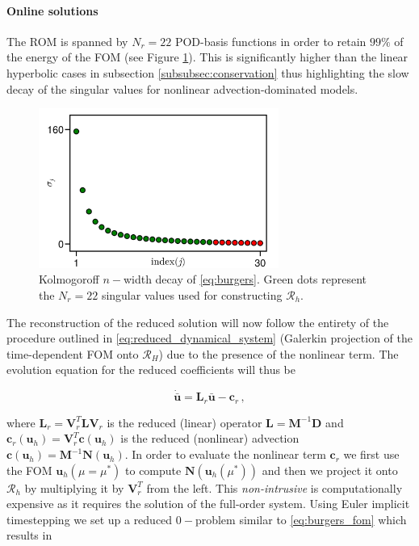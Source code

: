 \documentclass[../main.tex]{subfiles}
\begin{document}
\paragraph{Online solutions}\label{par:burgers_rom}

The ROM is spanned by $N_{r}=22$ POD-basis functions in order to retain $99\%$ of the energy of the FOM (see Figure \ref{fig:burgers_decay}).
This is significantly higher than the linear hyperbolic cases in subsection \ref{subsubsec:conservation} thus highlighting the slow decay of the singular values for nonlinear advection-dominated models.

\begin{figure}[H]
    \centering 
    \includegraphics[keepaspectratio, width=0.7\textwidth]{../figures/fig:burgers_decay.png}
    \caption{Kolmogoroff $n-$width decay of \eqref{eq:burgers}. Green dots represent the $N_{r}=22$ singular values used for constructing $\mathcal{R}_{h}$.}
    \label{fig:burgers_decay}
\end{figure}

The reconstruction of the reduced solution will now follow the entirety of the procedure outlined in \eqref{eq:reduced_dynamical_system} (Galerkin projection of the time-dependent FOM onto $\mathcal{R}_{H}$) due to the presence of the nonlinear term. 
The evolution equation for the reduced coefficients will thus be

\begin{equation*}
        \dot{\bar{\boldsymbol{u}}} = \boldsymbol{L}_{r}\bar{\boldsymbol{u}} - \boldsymbol{c}_{r} \,,
\end{equation*}

where $\boldsymbol{L}_{r} = \boldsymbol{V}_{r}^{T}\boldsymbol{L}\boldsymbol{V}_{r}$ is the reduced (linear) operator $\boldsymbol{L}=\boldsymbol{M}^{-1}\boldsymbol{D}$ and $\boldsymbol{c}_{r}(\boldsymbol{u}_{h}) = \boldsymbol{V}_{r}^{T}\boldsymbol{c}(\boldsymbol{u}_{h})$ is the reduced (nonlinear) advection $\boldsymbol{c}(\boldsymbol{u}_{h})=\boldsymbol{M}^{-1}\boldsymbol{N}(\boldsymbol{u}_{h})$.
In order to evaluate the nonlinear term $\boldsymbol{c}_{r}$ we first use the FOM $\boldsymbol{u}_{h}(\mu=\mu^{*})$ to compute $\boldsymbol{N}(\boldsymbol{u}_{h}(\mu^{*}))$ and then we project it onto $\mathcal{R}_{h}$ by multiplying it by $\boldsymbol{V}_{r}^{T}$ from the left.
This \textit{non-intrusive} is computationally expensive as it requires the solution of the full-order system.
Using Euler implicit timestepping we set up a reduced $0-$problem similar to \eqref{eq:burgers_fom} which results in
\end{document}
